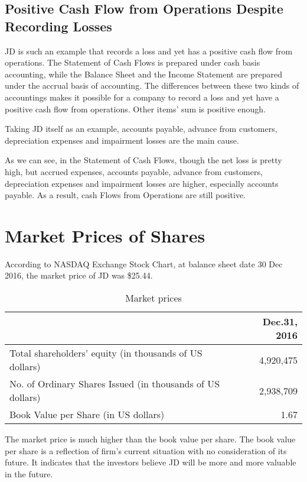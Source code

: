 \subsection{Positive Cash Flow from Operations Despite Recording Losses}
JD is such an example that records a loss and yet has a positive cash flow from operations. The Statement of Cash Flows is prepared under cash basis accounting, while the Balance Sheet and the Income Statement are prepared under the accrual basis of accounting. The differences between these two kinds of accountings makes it possible for a company to record a loss and yet have a positive cash flow from operations. Other items’ sum is positive enough.

Taking JD itself as an example, accounts payable, advance from customers, depreciation expenses and impairment losses are the main cause. 

As we can see, in the Statement of Cash Flows, though the net loss is pretty high, but accrued expenses, accounts payable, advance from customers, depreciation expenses and impairment losses are higher, especially accounts payable. As a result, cash Flows from Operations are still positive.

\section{Market Prices of Shares}
According to NASDAQ Exchange Stock Chart, at balance sheet date 30 Dec 2016, the market price of JD was \$25.44.

\begin{table}[H]	
	\begin{center}
		\begin{tabular}{p{11cm}r}
			\toprule
			&\textbf{Dec.31, 2016}\\
			\midrule
			Total shareholders’ equity (in thousands of US dollars)&	4,920,475\\
			No. of Ordinary Shares Issued (in thousands of US dollars) &	2,938,709\\
			Book Value per Share (in US dollars) &	1.67\\
			\bottomrule
		\end{tabular}
	\end{center}
	\caption{Market prices}\label{table:1}
\end{table}

The market price is much higher than the book value per share. The book value per share is a reflection of firm’s current situation with no consideration of its future. It indicates that the investors believe JD will be more and more valuable in the future.

